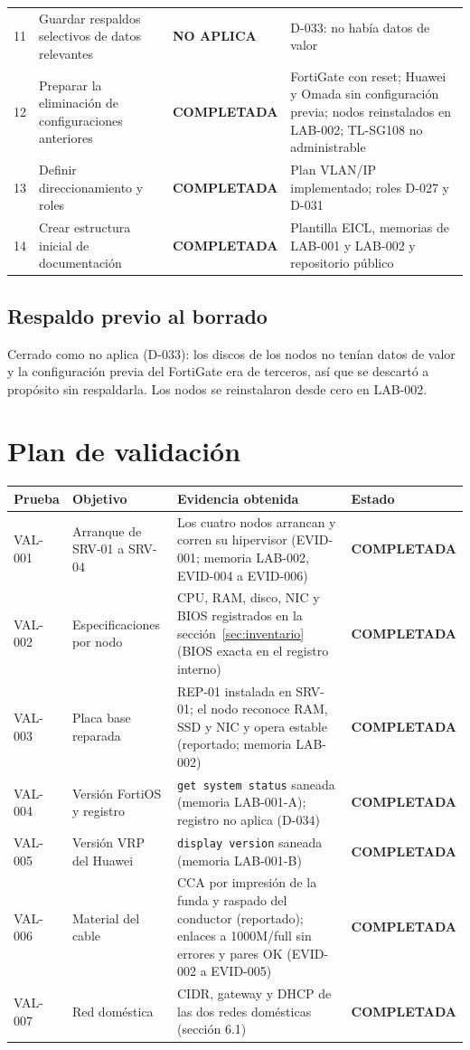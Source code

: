\documentclass[11pt,a4paper]{article}
\newcommand{\estadobase}[2]{\textcolor{#1}{\textbf{\footnotesize #2}}}
\newcommand{\compl}{\estadobase{okgreen}{COMPLETADA}}
\newcommand{\noapl}{\estadobase{muted}{NO APLICA}}
\begin{document}
{\begin{longtable}{L{0.7cm} L{6.0cm} L{2.7cm} L{5.1cm}}
  11 & Guardar respaldos selectivos de datos relevantes & \noapl & D-033: no había datos de valor\\
  12 & Preparar la eliminación de configuraciones anteriores & \compl & FortiGate con reset; Huawei y Omada sin configuración previa; nodos reinstalados en LAB-002; TL-SG108 no administrable\\
  13 & Definir direccionamiento y roles & \compl & Plan VLAN/IP implementado; roles D-027 y D-031\\
  14 & Crear estructura inicial de documentación & \compl & Plantilla EICL, memorias de LAB-001 y LAB-002 y repositorio público\\
  \bottomrule
\end{longtable}
}

\subsection{Respaldo previo al borrado}
Cerrado como no aplica (D-033): los discos de los nodos no tenían datos de valor y la configuración previa del FortiGate era de terceros, así que se descartó a propósito sin respaldarla. Los nodos se reinstalaron desde cero en LAB-002.

\section{Plan de validación}
{\small
\begin{longtable}{L{1.6cm} L{4.0cm} L{6.2cm} L{2.9cm}}
  \toprule
  \textbf{Prueba} & \textbf{Objetivo} & \textbf{Evidencia obtenida} & \textbf{Estado}\\
  \midrule
  \endhead
  VAL-001 & Arranque de SRV-01 a SRV-04 & Los cuatro nodos arrancan y corren su hipervisor (EVID-001; memoria LAB-002, EVID-004 a EVID-006) & \compl\\
  VAL-002 & Especificaciones por nodo & CPU, RAM, disco, NIC y BIOS registrados en la sección~\ref{sec:inventario} (BIOS exacta en el registro interno) & \compl\\
  VAL-003 & Placa base reparada & REP-01 instalada en SRV-01; el nodo reconoce RAM, SSD y NIC y opera estable (reportado; memoria LAB-002) & \compl\\
  VAL-004 & Versión FortiOS y registro & \texttt{get system status} saneada (memoria LAB-001-A); registro no aplica (D-034) & \compl\\
  VAL-005 & Versión VRP del Huawei & \texttt{display version} saneada (memoria LAB-001-B) & \compl\\
  VAL-006 & Material del cable & CCA por impresión de la funda y raspado del conductor (reportado); enlaces a 1000M/full sin errores y pares OK (EVID-002 a EVID-005) & \compl\\
  VAL-007 & Red doméstica & CIDR, gateway y DHCP de las dos redes domésticas (sección 6.1) & \compl\\
  \bottomrule
\end{longtable}
}
\end{document}
